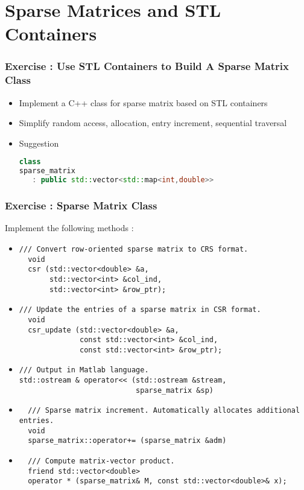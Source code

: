 \documentclass{beamer}
\begin{document}
\section{Sparse Matrices and STL Containers}

\begin{frame}[fragile]
\frametitle{Exercise : Use STL Containers to Build A Sparse Matrix Class}
\begin{itemize}
\item Implement a C++ class for sparse matrix based on STL containers
\item Simplify random access, allocation, entry increment, sequential traversal
\item Suggestion \small
\begin{lstlisting}[language=C++]
class 
sparse_matrix 
   : public std::vector<std::map<int,double>>
\end{lstlisting}\normalsize
\end{itemize}
\end{frame}



\begin{frame}[fragile]
\frametitle{Exercise : Sparse Matrix Class}
\tiny Implement the following methods :
\begin{itemize}

\item 
\tiny\begin{lstlisting}
/// Convert row-oriented sparse matrix to CRS format.
  void
  csr (std::vector<double> &a,
       std::vector<int> &col_ind,
       std::vector<int> &row_ptr);
\end{lstlisting} \normalsize

\item 
\tiny\begin{lstlisting}
/// Update the entries of a sparse matrix in CSR format.
  void
  csr_update (std::vector<double> &a,
              const std::vector<int> &col_ind,
              const std::vector<int> &row_ptr);
\end{lstlisting} \normalsize

\item 
\tiny\begin{lstlisting}
/// Output in Matlab language.
std::ostream & operator<< (std::ostream &stream,
                           sparse_matrix &sp)
\end{lstlisting} \normalsize

\item 
\tiny\begin{lstlisting}
  /// Sparse matrix increment. Automatically allocates additional entries.
  void 
  sparse_matrix::operator+= (sparse_matrix &adm)
\end{lstlisting} \normalsize

\item 
\tiny\begin{lstlisting}
  /// Compute matrix-vector product.
  friend std::vector<double>
  operator * (sparse_matrix& M, const std::vector<double>& x);
\end{lstlisting} \normalsize

\end{itemize}
\end{frame}
\end{document}
